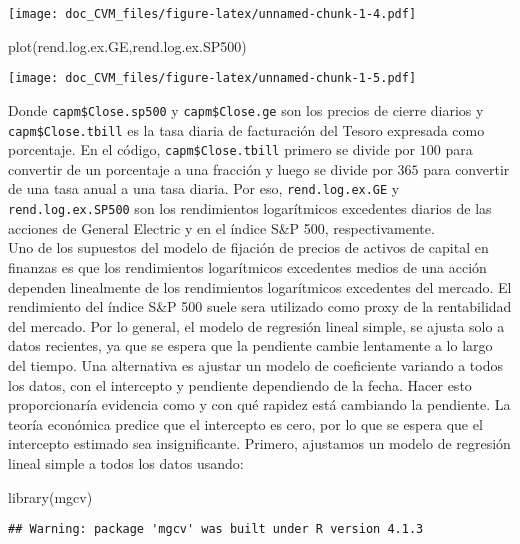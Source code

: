 \documentclass[
]{article}
\newenvironment{Shaded}{\begin{snugshade}}{\end{snugshade}}
\newcommand{\FunctionTok}[1]{\textcolor[rgb]{0.00,0.00,0.00}{#1}}
\newcommand{\NormalTok}[1]{#1}
\begin{document}
\texttt{[image: doc\_CVM\_files/figure-latex/unnamed-chunk-1-4.pdf]}

\begin{Shaded}
\begin{Highlighting}[]
\FunctionTok{plot}\NormalTok{(rend.log.ex.GE,rend.log.ex.SP500)}
\end{Highlighting}
\end{Shaded}

\texttt{[image: doc\_CVM\_files/figure-latex/unnamed-chunk-1-5.pdf]}

Donde \texttt{capm\$Close.sp500} y \texttt{capm\$Close.ge} son los
precios de cierre diarios y \texttt{capm\$Close.tbill} es la tasa diaria
de facturación del Tesoro expresada como porcentaje. En el código,
\texttt{capm\$Close.tbill} primero se divide por \(100\) para convertir
de un porcentaje a una fracción y luego se divide por \(365\) para
convertir de una tasa anual a una tasa diaria. Por eso,
\texttt{rend.log.ex.GE} y \texttt{rend.log.ex.SP500} son los
rendimientos logarítmicos excedentes diarios de las acciones de General
Electric y en el índice S\&P 500, respectivamente.\\
Uno de los supuestos del modelo de fijación de precios de activos de
capital en finanzas es que los rendimientos logarítmicos excedentes
medios de una acción dependen linealmente de los rendimientos
logarítmicos excedentes del mercado. El rendimiento del índice S\&P 500
suele sera utilizado como proxy de la rentabilidad del mercado. Por lo
general, el modelo de regresión lineal simple, se ajusta solo a datos
recientes, ya que se espera que la pendiente cambie lentamente a lo
largo del tiempo. Una alternativa es ajustar un modelo de coeficiente
variando a todos los datos, con el intercepto y pendiente dependiendo de
la fecha. Hacer esto proporcionaría evidencia como y con qué rapidez
está cambiando la pendiente. La teoría económica predice que el
intercepto es cero, por lo que se espera que el intercepto estimado sea
insignificante. Primero, ajustamos un modelo de regresión lineal simple
a todos los datos usando:

\begin{Shaded}
\begin{Highlighting}[]
\FunctionTok{library}\NormalTok{(mgcv)}
\end{Highlighting}
\end{Shaded}

\begin{verbatim}
## Warning: package 'mgcv' was built under R version 4.1.3
\end{verbatim}
\end{document}
